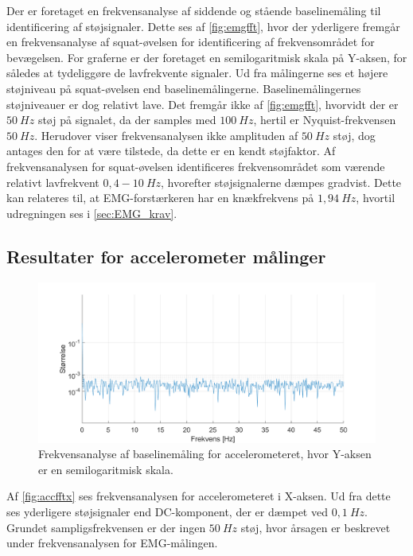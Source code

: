 \noindent
Der er foretaget en frekvensanalyse af siddende og stående baselinemåling til identificering af støjsignaler. Dette ses af \autoref{fig:emgfft}, hvor der yderligere fremgår en frekvensanalyse af squat-øvelsen for identificering af frekvensområdet for bevægelsen. For graferne er der foretaget en semilogaritmisk skala på Y-aksen, for således at tydeliggøre de lavfrekvente signaler. Ud fra målingerne ses et højere støjniveau på squat-øvelsen end baselinemålingerne. Baselinemålingernes støjniveauer er dog relativt lave. 
Det fremgår ikke af \autoref{fig:emgfft}, hvorvidt der er $50~Hz$ støj på signalet, da der samples med $100~Hz$, hertil er Nyquist-frekvensen $50~Hz$. Herudover viser frekvensanalysen ikke amplituden af $50~Hz$ støj, dog antages den for at være tilstede, da dette er en kendt støjfaktor. 
Af frekvensanalysen for squat-øvelsen identificeres frekvensområdet som værende relativt lavfrekvent $0,4-10~Hz$, hvorefter støjsignalerne dæmpes gradvist. Dette kan relateres til, at EMG-forstærkeren har en knækfrekvens på $1,94~Hz$, hvortil udregningen ses i \autoref{sec:EMG_krav}. 


\subsection{Resultater for accelerometer målinger} \label{sec:acc_fft}

\begin{figure}[H]
	\centering
	\includegraphics[width=1\textwidth]{figures/Pilotforsoeg/accfft.png}
	\caption{Frekvensanalyse af baselinemåling for accelerometeret, hvor Y-aksen er en semilogaritmisk skala.}
	\label{fig:accfftx}
\end{figure}

\noindent
Af \autoref{fig:accfftx} ses frekvensanalysen for accelerometeret i X-aksen. Ud fra dette ses yderligere støjsignaler end DC-komponent, der er dæmpet ved $0,1~Hz$. Grundet sampligsfrekvensen er der ingen $50~Hz$ støj, hvor årsagen er beskrevet under frekvensanalysen for EMG-målingen. 

